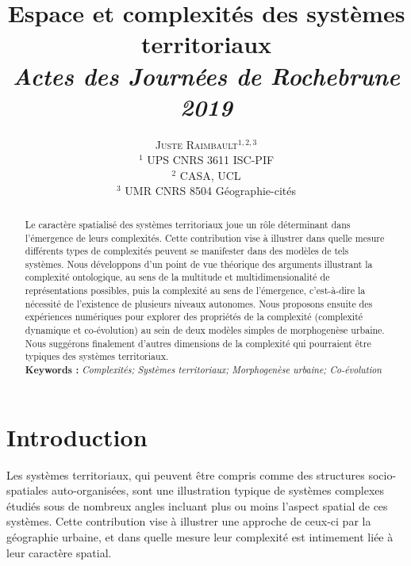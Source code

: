 \documentclass[11pt]{article}
\newcommand{\noun}[1]{\textsc{#1}}
\begin{document}
\title{Espace et complexités des systèmes territoriaux
\\\medskip
\textit{Actes des Journ{\'e}es de Rochebrune 2019}
}
\author{\noun{Juste Raimbault}$^{1,2,3}$
\\\bigskip
$^1$ UPS CNRS 3611 ISC-PIF\\
$^2$ CASA, UCL\\
$^3$ UMR CNRS 8504 G{\'e}ographie-cit{\'e}s
}
\date{}





\maketitle

\justify

\begin{abstract}
	Le caractère spatialisé des systèmes territoriaux joue un rôle déterminant dans l'émergence de leurs complexités. Cette contribution vise à illustrer dans quelle mesure différents types de complexités peuvent se manifester dans des modèles de tels systèmes. Nous développons d'un point de vue théorique des arguments illustrant la complexité ontologique, au sens de la multitude et multidimensionalité de représentations possibles, puis la complexité au sens de l'émergence, c'est-à-dire la nécessité de l'existence de plusieurs niveaux autonomes. Nous proposons ensuite des expériences numériques pour explorer des propriétés de la complexité (complexité dynamique et co-évolution) au sein de deux modèles simples de morphogenèse urbaine. Nous suggérons finalement d'autres dimensions de la complexité qui pourraient être typiques des systèmes territoriaux.\\\medskip
	\noindent\textbf{Keywords : }\textit{Complexités; Systèmes territoriaux; Morphogenèse urbaine; Co-évolution}
\end{abstract}





\section{Introduction}


Les systèmes territoriaux, qui peuvent être compris comme des structures socio-spatiales auto-organisées, sont une illustration typique de systèmes complexes étudiés sous de nombreux angles incluant plus ou moins l'aspect spatial de ces systèmes. Cette contribution vise à illustrer une approche de ceux-ci par la géographie urbaine, et dans quelle mesure leur complexité est intimement liée à leur caractère spatial.
\end{document}
